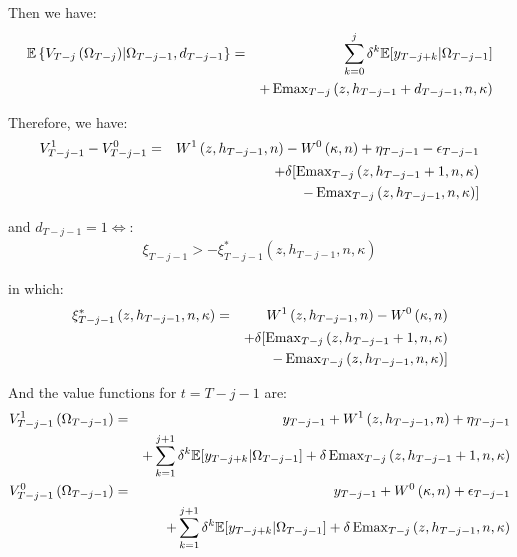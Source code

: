 \indent Then we have:
\begin{eqnarray}
\mathbb{E} \left\{ V_{T-j}\left(\Omega_{T-j}\right) \middle| \Omega_{T-j-1}, d_{T-j-1}\right\} &=&  \sum_{k=0}^{j} \delta^{k} \mathbb{E} [y_{T-j+k} | \Omega_{T-j-1}] \nonumber \\
& & + \operatorname{Emax}_{T-j} \left( z, h_{T-j-1}+d_{T-j-1}, n, \kappa \right)
\end{eqnarray}

\indent Therefore, we have:
\begin{eqnarray}
V^1_{T-j-1} - V^0_{T-j-1} &=& W^1\left( z, h_{T-j-1}, n\right) - W^0\left( \kappa, n\right) + \eta_{T-j-1} - \epsilon_{T-j-1} \nonumber \\
& & + \delta [ \operatorname{Emax}_{T-j} \left( z, h_{T-j-1}+1, n, \kappa \right) \nonumber \\
& & - \operatorname{Emax}_{T-j} \left(z, h_{T-j-1}, n, \kappa \right)]
\end{eqnarray}

\noindent and $d_{T-j-1} = 1 \iff $:
\begin{eqnarray}
\xi_{T-j-1} > -\xi^*_{T-j-1} \left(z, h_{T-j-1}, n, \kappa \right)
\end{eqnarray}

\noindent in which:
\begin{eqnarray}
\xi^*_{T-j-1} \left(z, h_{T-j-1}, n, \kappa \right) &=& W^1\left( z, h_{T-j-1}, n\right) - W^0\left( \kappa, n\right) \nonumber \\
& & + \delta [ \operatorname{Emax}_{T-j} \left( z, h_{T-j-1}+1, n, \kappa \right) \nonumber \\
& & - \operatorname{Emax}_{T-j} \left(z, h_{T-j-1}, n, \kappa \right)] \label{eq:policyFun_T-j-1}
\end{eqnarray}

\indent And the value functions for $t = T-j-1 $ are:
\begin{eqnarray}
V^{1}_{T-j-1}\left(\Omega_{T-j-1}\right) &=& y_{T-j-1} + W^1 \left(z,h_{T-j-1},n \right) + \eta_{T-j-1} \nonumber \\
& & + \sum_{k=1}^{j+1} \delta^{k} \mathbb{E} [y_{T-j+k} | \Omega_{T-j-1}] + \delta \operatorname{Emax}_{T-j} \left( z, h_{T-j-1}+1, n, \kappa \right) \\
V^{0}_{T-j-1}\left(\Omega_{T-j-1}\right) &=& y_{T-j-1} + W^0 \left( \kappa, n \right) + \epsilon_{T-j-1} \nonumber \\
& & + \sum_{k=1}^{j+1} \delta^{k} \mathbb{E} [y_{T-j+k} | \Omega_{T-j-1}] + \delta \operatorname{Emax}_{T-j} \left( z, h_{T-j-1}, n, \kappa \right) \label{eq:valueFun_T-j-1}
\end{eqnarray}

